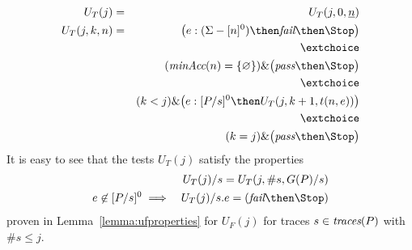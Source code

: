 \begin{eqnarray}
U_T(j) & = & U_T(j,0,\ii n)
\\
U_T(j,k,n) & = & \big(  e:(\Sigma - [n]^0)   \then \efail\then \Stop \big)
\label{eq:uta}
\\ & & \extchoice \nonumber
\\ & & (\minaccs(n) = \{ \varnothing \})   \&   \big( \epass \then \Stop \big)
\label{eq:utb}
\\ & & \extchoice \nonumber
\\ & & (k < j) \& \big( e:[P/s]^0   \then U_T(j,k+1,t(n,e)) \big)
\label{eq:utc}
\\ & & \extchoice \nonumber
\\ & & (k = j) \& \big( \epass\then \Stop  \big)
\label{eq:utd}
\end{eqnarray}
%
It is easy to see that the tests $U_T(j)$ satisfy the properties
\begin{eqnarray}
\label{eq:ifpaT}
  &  & U_T(j)/s = U_T(j,\#s,G(P)/s)
\\
\label{eq:ifpbT}
e\not\in [P/s]^0 & \implies & U_T(j)/s.e = (\efail\then\Stop)
\end{eqnarray}
proven in Lemma~\ref{lemma:ufproperties} for $U_F(j)$ for traces
$s\in\text{\it traces}(P)$ with $\#s \le j$. 


